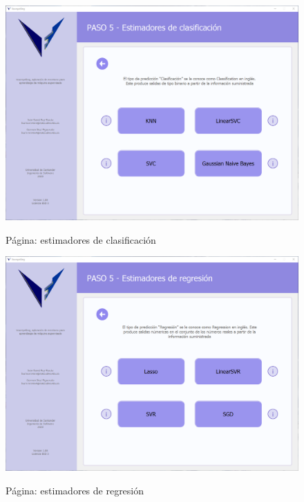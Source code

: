 \begin{figure}[H]
    \centering
    \caption{Página: estimadores de clasificación}
    \includegraphics[width=\textwidth]{views/classification_estimators.png}
    \label{fig:classificationestimators}
\end{figure}

\begin{figure}[H]
    \centering
    \caption{Página: estimadores de regresión}
    \includegraphics[width=\textwidth]{views/regression_estimators.png}
    \label{fig:regressionestimators}
\end{figure}


